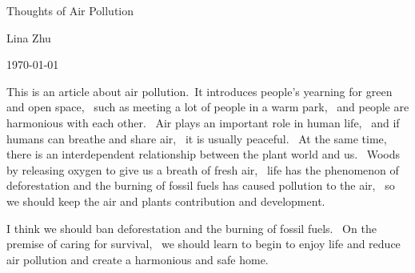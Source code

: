 \documentclass{article}
\begin{document}
	
	\begin{center}
		
		 Thoughts of Air Pollution
	\end{center}
	\begin{center}
	Lina Zhu
	\end{center}
	\begin{center}
		\today
	\end{center}
	
	\par This is an article about air pollution.~It introduces people's yearning for 
green and open space,~ such as meeting a lot of people in a warm park,~ and people are
 harmonious with each other.~ Air plays an important role in human life,~ and if humans
can breathe and share air,~ it is usually peaceful.~ At the same time,~ there is an 
interdependent relationship between the plant world and us.~ Woods by releasing oxygen 
to give us a breath of fresh air,~ life has the phenomenon of deforestation and the
 burning of fossil fuels has caused pollution to the air,~ so we should keep the air
 and plants contribution and development.
\par I think we should ban deforestation and the burning of fossil fuels.~ On the
 premise of caring for survival,~ we should learn to begin to enjoy life and reduce
 air pollution and create a harmonious and safe home.
	
\end{document}
